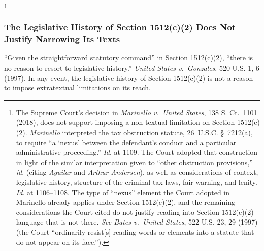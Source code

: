 \footnote{The Supreme Court's decision in \textit{Marinello v.\ United States}, 138 S. Ct.~1101 (2018), does not support imposing a non-textual limitation on Section 1512(c)(2).
\textit{Marinello} interpreted the tax obstruction statute, 26~U.S.C. \S~7212(a), to require ``a `nexus' between the defendant's conduct and a particular administrative proceeding.''
\textit{Id}. at 1109.
The Court adopted that construction in light of the similar interpretation given to ``other obstruction provisions,'' \textit{id}. (citing \textit{Aguilar} and \textit{Arthur Andersen}), as well as considerations of context, legislative history, structure of the criminal tax laws, fair warning, and lenity.
\textit{Id}. at 1106--1108.
The type of ``nexus'' element the Court adopted in Marinello already applies under Section 1512(c)(2), and the remaining considerations the Court cited do not justify reading into Section 1512(c)(2) language that is not there.
\textit{See Bates v.\ United States}, 522 U.S. 23, 29 (1997) (the Court ``ordinarily resist[s] reading words or elements into a statute that do not appear on its face.'').}

\subsubsection{The Legislative History of Section 1512(c)(2) Does Not Justify Narrowing Its Texts}

``Given the straightforward statutory command'' in Section 1512(c)(2), ``there is no reason to resort to legislative history.''
\textit{United States v.\ Gonzales}, 520 U.S. 1, 6 (1997).
In any event, the legislative history of Section 1512(c)(2) is not a reason to impose extratextual limitations on its reach.

